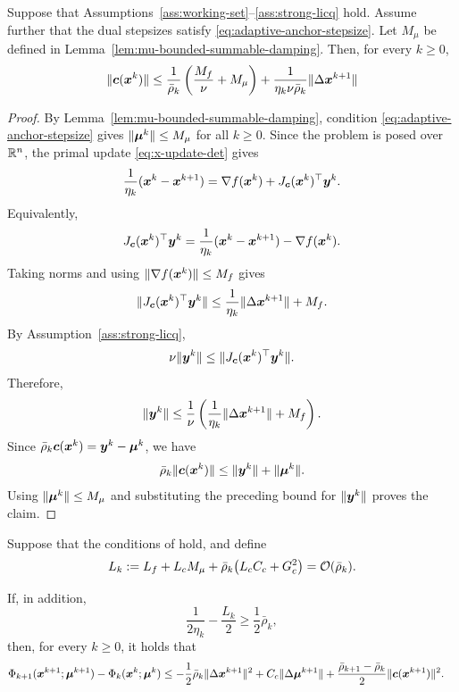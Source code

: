 \documentclass[10pt]{article}
\begin{document}
\begin{lemma}
\label{lem:effective-multiplier-feasibility-bound}
Suppose that Assumptions~\ref{ass:working-set}--\ref{ass:strong-licq} hold.
Assume further that the dual stepsizes satisfy
\eqref{eq:adaptive-anchor-stepsize}.
Let $M_\mu$ be defined in
Lemma~\ref{lem:mu-bounded-summable-damping}.  Then, for every $k\ge0$,
\[
    \|\bm{c}(\bm{x}^k)\|
    \le
    \frac{1}{\bar\rho_k}
    \left(
    \frac{M_f}{\nu}+M_\mu
    \right)
    +
    \frac{1}{\eta_k\nu\bar\rho_k}
    \|\Delta\bm{x}^{k+1}\|
\]
\end{lemma}

\begin{proof}
By Lemma~\ref{lem:mu-bounded-summable-damping}, condition
\eqref{eq:adaptive-anchor-stepsize} gives $\|\bm{\mu}^k\|\le M_\mu$ for all
$k\ge0$.
Since the problem is posed over $\mathbb{R}^n$, the primal update
\eqref{eq:x-update-det} gives
\[
    \frac{1}{\eta_k}(\bm{x}^k-\bm{x}^{k+1})
    =
    \nabla f(\bm{x}^k)
    +
    J_{\bm{c}}(\bm{x}^k)^\top\bm{y}^k.
\]
Equivalently,
\[
    J_{\bm{c}}(\bm{x}^k)^\top\bm{y}^k
    =
    \frac{1}{\eta_k}(\bm{x}^k-\bm{x}^{k+1})
    -
    \nabla f(\bm{x}^k).
\]
Taking norms and using $\|\nabla f(\bm{x}^k)\|\le M_f$ gives
\[
    \|J_{\bm{c}}(\bm{x}^k)^\top\bm{y}^k\|
    \le
    \frac{1}{\eta_k}\|\Delta\bm{x}^{k+1}\|
    +
    M_f.
\]
By Assumption~\ref{ass:strong-licq},
\[
    \nu\|\bm{y}^k\|
    \le
    \|J_{\bm{c}}(\bm{x}^k)^\top\bm{y}^k\|.
\]
Therefore,
\[
    \|\bm{y}^k\|
    \le
    \frac{1}{\nu}
    \left(
    \frac{1}{\eta_k}\|\Delta\bm{x}^{k+1}\|+M_f
    \right).
\]
Since $\bar\rho_k\bm{c}(\bm{x}^k)=\bm{y}^k-\bm{\mu}^k$, we have
\[
    \bar\rho_k\|\bm{c}(\bm{x}^k)\|
    \le
    \|\bm{y}^k\|+\|\bm{\mu}^k\|.
\]
Using $\|\bm{\mu}^k\|\le M_\mu$ and substituting the preceding bound for
$\|\bm{y}^k\|$ proves the claim.
\end{proof}

\begin{lemma}
\label{lem:descent-skeleton}
Suppose that the conditions of 
hold, and define
\begin{equation*}
    L_k:=L_f+L_cM_\mu+\bar\rho_k\bigl(L_c C_c+G_c^2\bigr) = \mathcal{O}(\bar\rho_k).
\end{equation*}

If, in addition,
\begin{equation}\label{eq:stepsize-sufficient-descent}
    \frac{1}{2\eta_k}-\frac{L_k}{2}\ge \frac{1}{2}\bar\rho_k,
\end{equation}
then, for every $k\ge0$, it holds that
\begin{equation}\label{eq:variable-penalty-descent-sufficient}
\begin{aligned}
    \Phi_{k+1}(\bm{x}^{k+1};\bm{\mu}^{k+1})-\Phi_k(\bm{x}^k;\bm{\mu}^k)
    &\le -\frac{1}{2}\bar\rho_k\|\Delta\bm{x}^{k+1}\|^2
    +C_c\|\Delta\bm{\mu}^{k+1}\| +\frac{\bar\rho_{k+1}-\bar\rho_k}{2}\|\bm{c}(\bm{x}^{k+1})\|^2 .
\end{aligned}
\end{equation}
\end{lemma}
\end{document}
